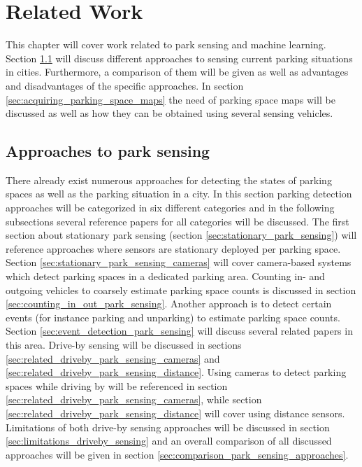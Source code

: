 \chapter{Related Work}
\label{chap:relatedwork}

This chapter will cover work related to park sensing and machine learning. Section \ref{sec:parksensing} will discuss different approaches to sensing current parking situations in cities. Furthermore, a comparison of them will be given as well as advantages and disadvantages of the specific approaches. In section \ref{sec:acquiring_parking_space_maps} the need of parking space maps will be discussed as well as how they can be obtained using several sensing vehicles. 



\section{Approaches to park sensing}
\label{sec:parksensing}

There already exist numerous approaches for detecting the states of parking spaces as well as the parking situation in a city. In this section parking detection approaches will be categorized in six different categories and in the following subsections several reference papers for all categories will be discussed. The first section about stationary park sensing (section \ref{sec:stationary_park_sensing}) will reference approaches where sensors are stationary deployed per parking space. Section \ref{sec:stationary_park_sensing_cameras} will cover camera-based systems which detect parking spaces in a dedicated parking area. Counting in- and outgoing vehicles to coarsely estimate parking space counts is discussed in section \ref{sec:counting_in_out_park_sensing}. Another approach is to detect certain events (for instance parking and unparking) to estimate parking space counts. Section \ref{sec:event_detection_park_sensing} will discuss several related papers in this area. Drive-by sensing will be discussed in sections \ref{sec:related_driveby_park_sensing_cameras} and \ref{sec:related_driveby_park_sensing_distance}. Using cameras to detect parking spaces while driving by will be referenced in section \ref{sec:related_driveby_park_sensing_cameras}, while section \ref{sec:related_driveby_park_sensing_distance} will cover using distance sensors. Limitations of both drive-by sensing approaches will be discussed in section \ref{sec:limitations_driveby_sensing} and an overall comparison of all discussed approaches will be given in section \ref{sec:comparison_park_sensing_approaches}.



